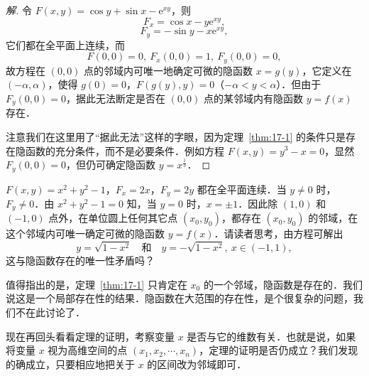 \begin{proof}[解]
令 $F(x,y)=\cos y+\sin x-\mathrm{e}^{xy}$，则
\[
F_{x}=\cos x-y\mathrm{e}^{xy},
\]
\[
F_{y}=-\sin y-x\mathrm{e}^{xy},
\]
它们都在全平面上连续，而
\[
F(0,0)=0,\ F_{x}(0,0)=1,\ F_{y}(0,0)=0,
\]
故方程在 $(0,0)$ 点的邻域内可唯一地确定可微的隐函数 $x=g(y)$，它定义在 $(-\alpha,\alpha)$，使得 $g(0)=0$，$F(g(y),y)=0$（$-\alpha<y<\alpha$）．但由于 $F_{y}(0,0)=0$，据此无法断定是否在 $(0,0)$ 点的某邻域内有隐函数 $y=f(x)$ 存在．

注意我们在这里用了``据此无法''这样的字眼，因为定理~\ref{thm:17-1} 的条件只是存在隐函数的充分条件，而不是必要条件．例如方程 $F(x,y)=y^{3}-x=0$，显然 $F_{y}(0,0)=0$，但仍可确定隐函数 $y=x^{\frac{1}{3}}$．
\end{proof}

\begin{example}\label{ex:17-1-2}
$F(x,y)=x^{2}+y^{2}-1$，$F_{x}=2x$，$F_{y}=2y$ 都在全平面连续．当 $y\neq0$ 时，$F_{y}\neq0$．由 $x^{2}+y^{2}-1=0$ 知，当 $y=0$ 时，$x=\pm1$．因此除 $(1,0)$ 和 $(-1,0)$ 点外，在单位圆上任何其它点 $(x_{0},y_{0})$，都存在 $(x_{0},y_{0})$ 的邻域，在这个邻域内可唯一确定可微的隐函数 $y=f(x)$．请读者思考，由方程可解出
\[
y=\sqrt{1-x^{2}}\quad\text{和}\quad y=-\sqrt{1-x^{2}},\ x\in(-1,1),
\]
这与隐函数存在的唯一性矛盾吗？
\end{example}

值得指出的是，定理~\ref{thm:17-1} 只肯定在 $x_{0}$ 的一个邻域，隐函数是存在的．我们说这是一个局部存在性的结果．隐函数在大范围的存在性，是个很复杂的问题，我们不在此讨论了．

现在再回头看看定理的证明，考察变量 $x$ 是否与它的维数有关．也就是说，如果将变量 $x$ 视为高维空间的点 $(x_{1},x_{2},\cdots,x_{n})$，定理的证明是否仍成立？我们发现的确成立，只要相应地把关于 $x$ 的区间改为邻域即可．

\begin{figure}[htbp]
\centering
{}\caption{\relax}\label{fig:17-3}
\end{figure}

